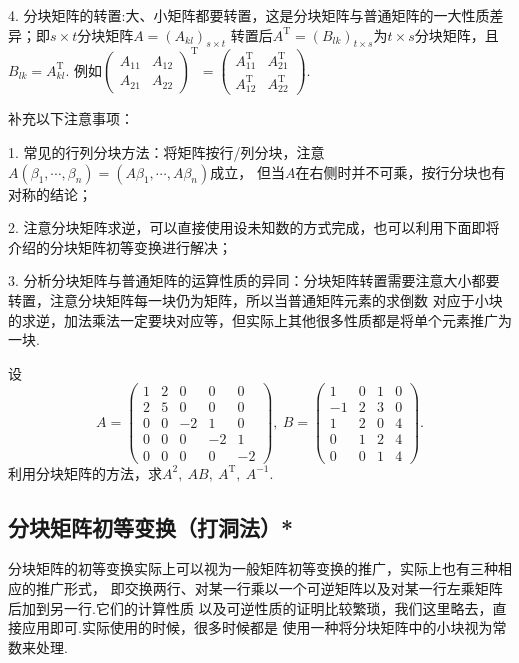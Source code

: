 4. 分块矩阵的转置:大、小矩阵都要转置，这是分块矩阵与普通矩阵的一大性质差异；即$s \times t$分块矩阵$A=(A_{kl})_{s \times t}$
转置后$A^\mathrm{T}=(B_{lk})_{t \times s}$为$t \times s$分块矩阵，且$B_{lk}=A_{kl}^\mathrm{T}$.
例如$\begin{pmatrix}
	A_{11} & A_{12} \\ A_{21} & A_{22}
\end{pmatrix}^\mathrm{T}=\begin{pmatrix}
	A_{11}^\mathrm{T} & A_{21}^\mathrm{T} \\ A_{12}^\mathrm{T} & A_{22}^\mathrm{T}
\end{pmatrix}$.

补充以下注意事项：

1. 常见的行列分块方法：将矩阵按行/列分块，注意$A(\beta_1,\cdots,\beta_n)=(A\beta_1,\cdots,A\beta_n)$成立，
但当$A$在右侧时并不可乘，按行分块也有对称的结论；

2. 注意分块矩阵求逆，可以直接使用设未知数的方式完成，也可以利用下面即将介绍的分块矩阵初等变换进行解决；

3. 分析分块矩阵与普通矩阵的运算性质的异同：分块矩阵转置需要注意大小都要转置，注意分块矩阵每一块仍为矩阵，所以当普通矩阵元素的求倒数
对应于小块的求逆，加法乘法一定要块对应等，但实际上其他很多性质都是将单个元素推广为一块.
\begin{example}
	设$$A=\begin{pmatrix}
		1 & 2 & 0 & 0 & 0 \\
		2 & 5 & 0 & 0 & 0 \\
		0 & 0 & -2 & 1 & 0 \\
		0 & 0 & 0 & -2 & 1 \\
		0 & 0 & 0 & 0 & -2
	\end{pmatrix},\ B=\begin{pmatrix}
		1 & 0 & 1 & 0 \\
		-1 & 2 & 3 & 0 \\
		1 & 2 & 0 & 4 \\
		0 & 1 & 2 & 4 \\
		0 & 0 & 1 & 4
	\end{pmatrix}.$$
	利用分块矩阵的方法，求$A^2,\ AB,\ A^\mathrm{T},\ A^{-1}$.
\end{example}
\subsection{分块矩阵初等变换（打洞法）*}
分块矩阵的初等变换实际上可以视为一般矩阵初等变换的推广，实际上也有三种相应的推广形式，
即交换两行、对某一行乘以一个可逆矩阵以及对某一行左乘矩阵后加到另一行.它们的计算性质
以及可逆性质的证明比较繁琐，我们这里略去，直接应用即可.实际使用的时候，很多时候都是
使用一种将分块矩阵中的小块视为常数来处理.

